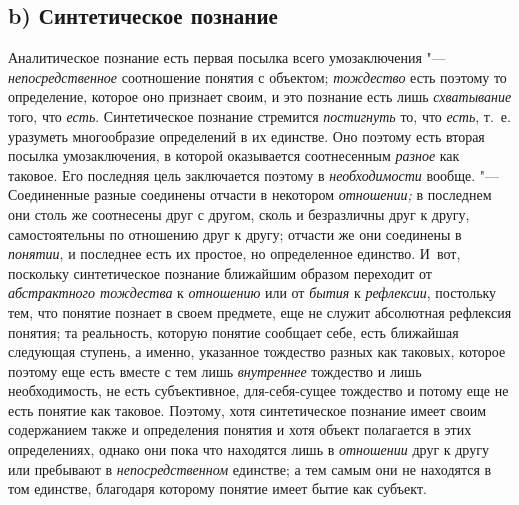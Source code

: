 \subsection[b) Синтетическое познание]{b) Синтетическое познание}
Аналитическое познание есть первая посылка всего
умозаключения "--- {\em непосредственное}
соотношение понятия с объектом;
{\em тождество} есть
поэтому то определение, которое оно признает своим, и это познание есть
лишь {\em схватывание}
того, что {\em есть}.
Синтетическое познание стремится
{\em постигнуть} то, что
{\em есть}, т.~е.
уразуметь многообразие определений в их единстве. Оно поэтому есть вторая
посылка умозаключения, в
которой
оказывается соотнесенным
{\em разное} как таковое.
Его последняя цель заключается поэтому в
{\em необходимости}
вообще. "--- Соединенные разные соединены отчасти
в некотором {\em отношении;}
в последнем они столь же соотнесены друг с другом, сколь и
безразличны друг к другу, самостоятельны по отношению друг к другу; отчасти
же они соединены в {\em понятии},
и последнее есть их простое, но определенное единство. И~вот,
поскольку синтетическое познание ближайшим образом переходит от
{\em абстрактного тождества}
к {\em отношению}
или от {\em бытия}
к {\em рефлексии},
постольку тем, что понятие познает в своем предмете, еще не
служит абсолютная рефлексия понятия; та реальность, которую понятие
сообщает себе, есть ближайшая следующая ступень, а именно, указанное
тождество разных как таковых, которое поэтому еще есть вместе с тем лишь
{\em внутреннее}
тождество и лишь необходимость, не есть субъективное,
для-себя-сущее тождество и потому еще не есть понятие как таковое. Поэтому,
хотя синтетическое познание имеет своим содержанием также и определения
понятия и хотя объект полагается в этих определениях, однако они пока что
находятся лишь в {\em отношении}
друг к другу или пребывают в
{\em непосредственном}
единстве; а тем самым они не находятся в том единстве,
благодаря которому понятие имеет бытие как субъект.

